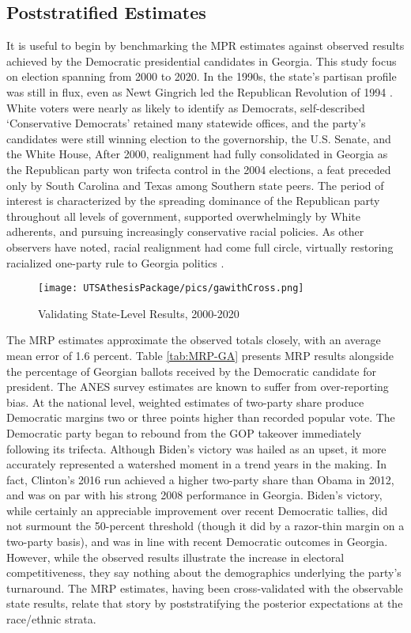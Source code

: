 \subsection{Poststratified Estimates}

It is useful to begin by benchmarking the MPR estimates against observed results achieved by the Democratic presidential candidates in Georgia. This study focus on election spanning from 2000 to 2020. In the 1990s, the state's partisan profile was still in flux, even as Newt Gingrich led the Republican Revolution of 1994 \citet{black_rise_2009}. White voters were nearly as likely to identify as Democrats, self-described `Conservative Democrats' retained many statewide offices, and the party's candidates were still winning election to the governorship, the U.S. Senate, and the White House,  After 2000, realignment had fully consolidated in Georgia as the Republican party won trifecta control in the 2004 elections, a feat preceded only by South Carolina and Texas among Southern state peers. The period of interest is characterized by the spreading dominance of the Republican party throughout all levels of government, supported overwhelmingly by White adherents, and pursuing increasingly conservative racial policies. As other observers have noted, racial realignment had come full circle, virtually restoring racialized one-party rule to Georgia politics \citep{lupton_dixies_2020, glaser_back_1994}. 

\begin{figure}[ht]
\centering
\texttt{[image: UTSAthesisPackage/pics/gawithCross.png]}
\caption{Validating State-Level Results, 2000-2020}
\label{fig:ga-cross}
\end{figure}


The MRP estimates approximate the observed totals closely, with an average mean error of 1.6 percent. Table \ref{tab:MRP-GA} presents MRP results alongside the percentage of Georgian ballots received by the Democratic candidate for president. The ANES survey estimates are known to suffer from over-reporting bias. At the national level, weighted estimates of two-party share produce Democratic margins two or three points higher than recorded popular vote. The Democratic party began to rebound from the GOP takeover immediately following its trifecta. Although Biden's victory was hailed as an upset, it more accurately represented a watershed moment in a trend years in the making. In fact, Clinton's 2016 run achieved a higher two-party share than Obama in 2012, and was on par with his strong 2008 performance in Georgia. Biden's victory, while certainly an appreciable improvement over recent Democratic tallies, did not surmount the 50-percent threshold (though it did by a razor-thin margin on a two-party basis), and was in line with recent Democratic outcomes in Georgia. However, while the observed results illustrate the increase in electoral competitiveness, they say nothing about the demographics underlying the party's turnaround. The MRP estimates, having been cross-validated with the observable state results, relate that story by poststratifying the posterior expectations at the race/ethnic strata.  

